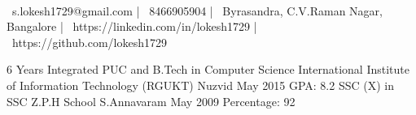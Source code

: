 \documentclass[]{awesome-cv}
\begin{document}
\begin{center}
	  \\
	\vspace{2mm}
	{\faEnvelope\ s.lokesh1729@gmail.com} | {\faMobile\ 8466905904} | {\faMapMarker\ Byrasandra, C.V.Raman Nagar, Bangalore} | {\faLink\ https://linkedin.com/in/lokesh1729} | {\faLink\ https://github.com/lokesh1729}
\end{center}
\begin{cventries}
	\cventry
	{6 Years Integrated PUC and B.Tech in Computer Science}
	{International Institute of Information Technology (RGUKT)}
	{Nuzvid}
	{May 2015}
	{GPA: 8.2}
	\cventry
	{SSC (X) in SSC}
	{Z.P.H School}
	{S.Annavaram}
	{May 2009}
	{Percentage: 92}
\end{cventries}
\end{document}
